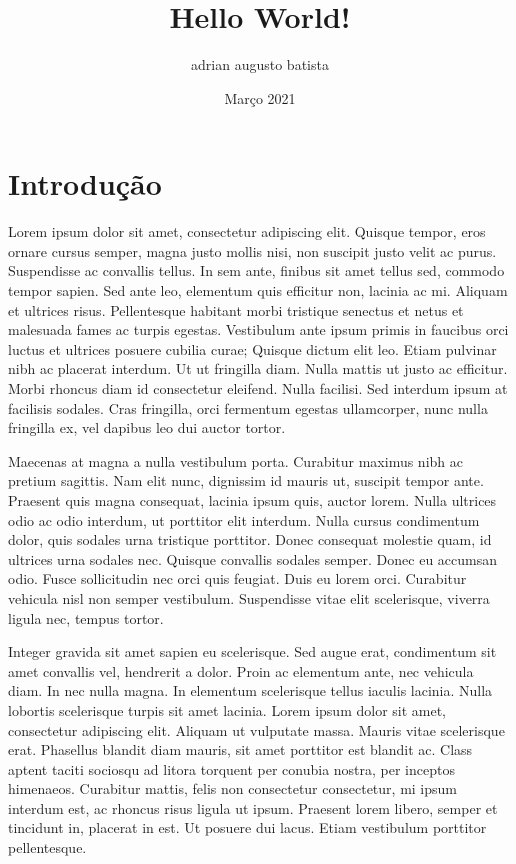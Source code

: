\documentclass{article}
\title{Hello World!}
\author{adrian augusto batista}
\date{Março 2021}
\begin{document}
\maketitle

\section{Introdução}

Lorem ipsum dolor sit amet, consectetur adipiscing elit. Quisque tempor, eros ornare cursus semper, magna justo mollis nisi, non suscipit justo velit ac purus. Suspendisse ac convallis tellus. In sem ante, finibus sit amet tellus sed, commodo tempor sapien. Sed ante leo, elementum quis efficitur non, lacinia ac mi. Aliquam et ultrices risus. Pellentesque habitant morbi tristique senectus et netus et malesuada fames ac turpis egestas. Vestibulum ante ipsum primis in faucibus orci luctus et ultrices posuere cubilia curae; Quisque dictum elit leo. Etiam pulvinar nibh ac placerat interdum. Ut ut fringilla diam. Nulla mattis ut justo ac efficitur. Morbi rhoncus diam id consectetur eleifend. Nulla facilisi. Sed interdum ipsum at facilisis sodales. Cras fringilla, orci fermentum egestas ullamcorper, nunc nulla fringilla ex, vel dapibus leo dui auctor tortor.

Maecenas at magna a nulla vestibulum porta. Curabitur maximus nibh ac pretium sagittis. Nam elit nunc, dignissim id mauris ut, suscipit tempor ante. Praesent quis magna consequat, lacinia ipsum quis, auctor lorem. Nulla ultrices odio ac odio interdum, ut porttitor elit interdum. Nulla cursus condimentum dolor, quis sodales urna tristique porttitor. Donec consequat molestie quam, id ultrices urna sodales nec. Quisque convallis sodales semper. Donec eu accumsan odio. Fusce sollicitudin nec orci quis feugiat. Duis eu lorem orci. Curabitur vehicula nisl non semper vestibulum. Suspendisse vitae elit scelerisque, viverra ligula nec, tempus tortor.

Integer gravida sit amet sapien eu scelerisque. Sed augue erat, condimentum sit amet convallis vel, hendrerit a dolor. Proin ac elementum ante, nec vehicula diam. In nec nulla magna. In elementum scelerisque tellus iaculis lacinia. Nulla lobortis scelerisque turpis sit amet lacinia. Lorem ipsum dolor sit amet, consectetur adipiscing elit. Aliquam ut vulputate massa. Mauris vitae scelerisque erat. Phasellus blandit diam mauris, sit amet porttitor est blandit ac. Class aptent taciti sociosqu ad litora torquent per conubia nostra, per inceptos himenaeos. Curabitur mattis, felis non consectetur consectetur, mi ipsum interdum est, ac rhoncus risus ligula ut ipsum. Praesent lorem libero, semper et tincidunt in, placerat in est. Ut posuere dui lacus. Etiam vestibulum porttitor pellentesque.
\end{document}
